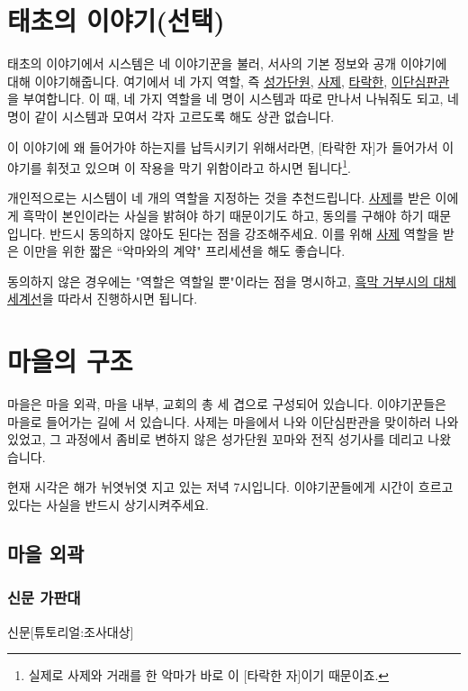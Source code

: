 \documentclass{report}
\begin{document}
	\section{태초의 이야기(선택)}
		태초의 이야기에서 시스템은 네 이야기꾼을 불러, 서사의 기본 정보와 공개 이야기에 대해 이야기해줍니다. 여기에서 네 가지 역할, 즉 \hyperlink{cursed-bard}{성가단원}, \hyperlink{cowardly-priest}{사제}, \hyperlink{corrupt-paladin}{타락한}, \hyperlink{hurt-rogue}{이단심판관}을 부여합니다. 이 때, 네 가지 역할을 네 명이 시스템과 따로 만나서 나눠줘도 되고, 네명이 같이 시스템과 모여서 각자 고르도록 해도 상관 없습니다.
		
		이 이야기에 왜 들어가야 하는지를 납득시키기 위해서라면, [타락한 자]가 들어가서 이야기를 휘젓고 있으며 이 작용을 막기 위함이라고 하시면 됩니다\footnote{실제로 사제와 거래를 한 악마가 바로 이 [타락한 자]이기 때문이죠.}.
		
		개인적으로는 시스템이 네 개의 역할을 지정하는 것을 추천드립니다. \hyperlink{cowardly-priest}{사제}를 받은 이에게 흑막이 본인이라는 사실을 밝혀야 하기 때문이기도 하고, 동의를 구해야 하기 때문입니다. 반드시 동의하지 않아도 된다는 점을 강조해주세요. 이를 위해 \hyperlink{cowardly-priest}{사제} 역할을 받은 이만을 위한 짧은 ``악마와의 계약" 프리세션을 해도 좋습니다.
		
		동의하지 않은 경우에는 "역할은 역할일 뿐"이라는 점을 명시하고, \hyperlink{alternative:no-criminal}{흑막 거부시의 대체 세계선}을 따라서 진행하시면 됩니다.
	
	\section{마을의 구조}
		마을은 마을 외곽, 마을 내부, 교회의 총 세 겹으로 구성되어 있습니다. 이야기꾼들은 마을로 들어가는 길에 서 있습니다. 사제는 마을에서 나와 이단심판관을 맞이하러 나와있었고, 그 과정에서 좀비로 변하지 않은 성가단원 꼬마와 전직 성기사를 데리고 나왔습니다.
		
		현재 시각은 해가 뉘엿뉘엿 지고 있는 저녁 7시입니다. 이야기꾼들에게 시간이 흐르고 있다는 사실을 반드시 상기시켜주세요.
		
			\subsection{마을 외곽}
				\hypertarget{search:newspaper-stand}{}
				\subsubsection*{신문 가판대}
					\begin{spoiler}{신문}{[튜토리얼:조사대상]}
						
						
					\end{spoiler}
				
\end{document}
